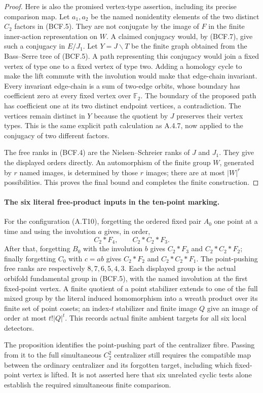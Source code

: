 \begin{proof}
Here is also the promised vertex-type assertion, including
its precise comparison map.  Let $a_1,a_2$ be the named
nonidentity elements of the two distinct $C_2$ factors
in (BCF.5).  They are not conjugate by the image of $F$
in the finite inner-action representation on $W$.
A claimed conjugacy would, by (BCF.7), give such a
conjugacy in $E/J_1$.  Let $Y=J\backslash T$ be the
finite graph obtained from the Bass--Serre tree of (BCF.5).
A path representing this conjugacy would join a fixed
vertex of type one to a fixed vertex of type two.  Adding
a homology cycle to make the lift commute with the
involution would make that edge-chain invariant.  Every
invariant edge-chain is a sum of two-edge orbits, whose
boundary has coefficient zero at every fixed vertex over
$\mathbb F_2$.  The boundary of the proposed path has
coefficient one at its two distinct endpoint vertices,
a contradiction.  The vertices remain distinct in $Y$
because the quotient by $J$ preserves their vertex types.
This is the same explicit path calculation as A.4.7,
now applied to the conjugacy of two different factors.

The free ranks in (BCF.4) are the Nielsen--Schreier ranks
of $J$ and $J_1$.  They give the displayed orders directly.
An automorphism of the finite group $W$, generated by
$r$ named images, is determined by those $r$ images;
there are at most $|W|^r$ possibilities.  This proves
the final bound and completes the finite construction.
\end{proof}

\paragraph{The six literal free-product inputs in the ten-point marking.}
For the configuration (A.T10), forgetting the ordered fixed
pair $A_0$ one point at a time and using the involution $a$
gives, in order,
\[
 C_2*F_4,\qquad C_2*C_2*F_3.
\]
After that, forgetting $B_0$ with the involution $b$ gives
$C_2*F_3$ and $C_2*C_2*F_2$; finally forgetting $C_0$
with $c=ab$ gives $C_2*F_2$ and $C_2*C_2*F_1$.
The point-pushing free ranks are respectively $8,7,6,5,4,3$.
Each displayed group is the actual orbifold fundamental
group in (BCF.5), with the named involution at the first
fixed-point vertex.  A finite quotient of a point stabilizer
extends to one of the full mixed group by the literal
induced homomorphism into a wreath product over its finite
set of point cosets; an index-$t$ stabilizer and finite
image $Q$ give an image of order at most $t!|Q|^t$.
This records actual finite ambient targets for all six
local detectors.

The proposition identifies the point-pushing part of the
centralizer fibre.  Passing from it to the full simultaneous
$C_2^2$ centralizer still requires the compatible map between
the ordinary centralizer and its forgotten target, including
which fixed-point vertex is lifted.  It is not asserted
here that six unrelated cyclic tests alone establish the
required simultaneous finite comparison.
